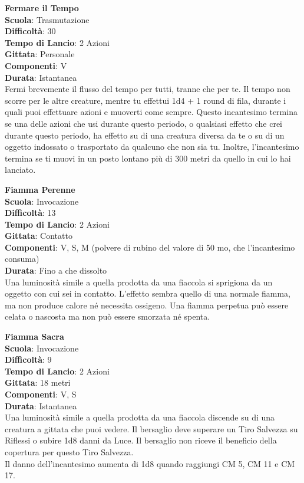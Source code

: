 \begin{multicols}{2}
\medskip\textbf{Fermare il Tempo}\\
\textbf{Scuola}: Trasmutazione\\
\textbf{Difficoltà}: 30\\
\textbf{Tempo di Lancio}: 2 Azioni\\
\textbf{Gittata}: Personale\\
\textbf{Componenti}: V\\
\textbf{Durata}: Istantanea\\
Fermi brevemente il flusso del tempo per tutti, tranne che per te. Il tempo non scorre per le altre creature, mentre tu effettui 1d4 + 1 round di fila, durante i quali puoi effettuare azioni e muoverti come sempre. Questo incantesimo termina se una delle azioni che usi durante questo periodo, o qualsiasi effetto che crei durante questo periodo, ha effetto su di una creatura diversa da te o su di un oggetto indossato o trasportato da qualcuno che non sia tu. Inoltre, l'incantesimo termina se ti muovi in un posto lontano più di 300 metri da quello in cui lo hai lanciato.

\medskip\textbf{Fiamma Perenne}\\
\textbf{Scuola}: Invocazione\\
\textbf{Difficoltà}: 13\\
\textbf{Tempo di Lancio}: 2 Azioni\\
\textbf{Gittata}: Contatto\\
\textbf{Componenti}: V, S, M (polvere di rubino del valore di 50 mo, che l'incantesimo consuma)\\ \textbf{Durata}: Fino a che dissolto\\
Una luminosità simile a quella prodotta da una fiaccola si sprigiona da un oggetto con cui sei in contatto. L'effetto sembra quello di una normale fiamma, ma non produce calore né necessita ossigeno. Una fiamma perpetua può essere celata o nascosta ma non può essere smorzata né spenta.

\medskip\textbf{Fiamma Sacra}\\
\textbf{Scuola}: Invocazione\\
\textbf{Difficoltà}: 9\\
\textbf{Tempo di Lancio}: 2 Azioni\\
\textbf{Gittata}: 18 metri\\
\textbf{Componenti}: V, S\\
\textbf{Durata}: Istantanea\\
Una luminosità simile a quella prodotta da una fiaccola discende su di una creatura a gittata che puoi vedere. Il bersaglio deve superare un Tiro Salvezza su Riflessi o subire 1d8 danni da Luce. Il bersaglio non riceve il beneficio della copertura per questo Tiro Salvezza.\\
Il danno dell'incantesimo aumenta di 1d8 quando raggiungi CM 5, CM 11 e CM 17.


\end{multicols}
